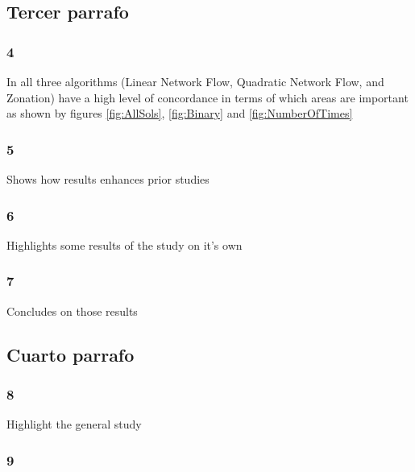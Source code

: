 \documentclass[]{article}
\begin{document}
\hypertarget{tercer-parrafo}{%
\subsection{Tercer parrafo}\label{tercer-parrafo}}

\hypertarget{section-1}{%
\subsubsection{4}\label{section-1}}

In all three algorithms (Linear Network Flow, Quadratic Network Flow, and Zonation) have a high level of concordance in terms of which areas are important as shown by figures \ref{fig:AllSols}, \ref{fig:Binary} and \ref{fig:NumberOfTimes}

\hypertarget{section-2}{%
\subsubsection{5}\label{section-2}}

Shows how results enhances prior studies

\hypertarget{section-3}{%
\subsubsection{6}\label{section-3}}

Highlights some results of the study on it's own

\hypertarget{section-4}{%
\subsubsection{7}\label{section-4}}

Concludes on those results

\hypertarget{cuarto-parrafo}{%
\subsection{Cuarto parrafo}\label{cuarto-parrafo}}

\hypertarget{section-5}{%
\subsubsection{8}\label{section-5}}

Highlight the general study

\hypertarget{section-6}{%
\subsubsection{9}\label{section-6}}
\end{document}
